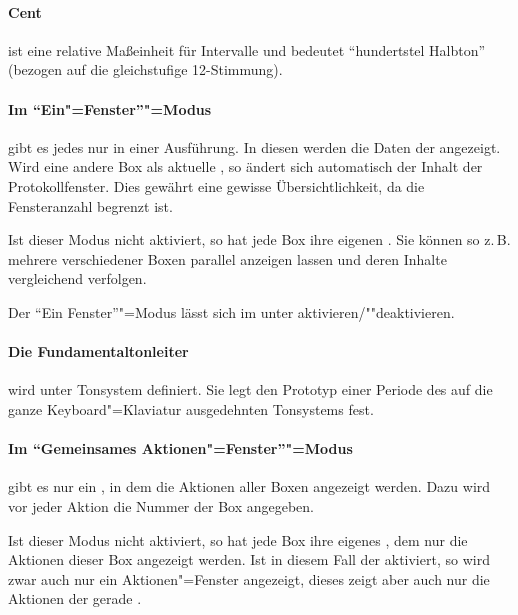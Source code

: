 \paragraph{Cent}\label{sec:DV_CENT} ist eine relative
  Maßeinheit für Intervalle und bedeutet "`hundertstel Halbton"'
  (bezogen auf die gleichstufige 12-Stimmung).

\paragraph{Im "`Ein"=Fenster"'"=Modus}\label{sec:DV_OWM} gibt es
  jedes  nur in einer
  Ausführung. In diesen werden die Daten der
   angezeigt. Wird
  eine andere Box als aktuelle , so ändert sich automatisch der Inhalt der
  Protokollfenster. Dies gewährt eine gewisse Übersichtlichkeit, da
  die Fensteranzahl begrenzt ist.

  Ist dieser Modus nicht aktiviert, so hat jede Box ihre eigenen
  . Sie können so z.\,B.
  mehrere 
  verschiedener Boxen parallel anzeigen lassen und deren Inhalte
  vergleichend verfolgen.

  Der "`Ein Fenster"'"=Modus lässt sich im
   unter  aktivieren/""deaktivieren.

\paragraph{Die Fundamentaltonleiter}\label{sec:DV_FUNDTONLEITER}\label{sec:DV_FT}
wird unter Tonsystem definiert. Sie legt den Prototyp einer Periode
des auf die ganze Keyboard"=Klaviatur ausgedehnten Tonsystems fest.

\paragraph{Im "`Gemeinsames
    Aktionen"=Fenster"'"=Modus}\label{sec:DV_CAW} gibt es nur ein
  , in dem die Aktionen
  aller Boxen angezeigt werden. Dazu wird vor jeder Aktion die Nummer
  der Box angegeben.

  Ist dieser Modus nicht aktiviert, so hat jede Box ihre eigenes
  , dem nur die Aktionen
  dieser Box angezeigt werden. Ist in diesem Fall der
   aktiviert, so wird zwar
  auch nur ein Aktionen"=Fenster angezeigt, dieses zeigt aber auch nur
  die Aktionen der gerade .

